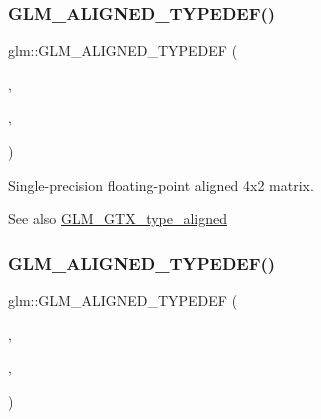 \subsubsection{\texorpdfstring{G\+L\+M\+\_\+\+A\+L\+I\+G\+N\+E\+D\+\_\+\+T\+Y\+P\+E\+D\+E\+F()}{GLM\_ALIGNED\_TYPEDEF()}\hspace{0.1cm}{\footnotesize\ttfamily [178/209]}}
{\footnotesize\ttfamily glm\+::\+G\+L\+M\+\_\+\+A\+L\+I\+G\+N\+E\+D\+\_\+\+T\+Y\+P\+E\+D\+EF (\begin{DoxyParamCaption}\item[{\hyperlink{group__gtc__type__precision_ga9325d382b334066a4c90a814c9040359}{fmat4x2}}]{,  }\item[{aligned\+\_\+fmat4x2}]{,  }\item[{16}]{ }\end{DoxyParamCaption})}

Single-\/precision floating-\/point aligned 4x2 matrix. \begin{DoxySeeAlso}{See also}
\hyperlink{group__gtx__type__aligned}{G\+L\+M\+\_\+\+G\+T\+X\+\_\+type\+\_\+aligned} 
\end{DoxySeeAlso}
\mbox{\label{group__gtx__type__aligned_ga7c117e3ecca089e10247b1d41d88aff9}} 
\subsubsection{\texorpdfstring{G\+L\+M\+\_\+\+A\+L\+I\+G\+N\+E\+D\+\_\+\+T\+Y\+P\+E\+D\+E\+F()}{GLM\_ALIGNED\_TYPEDEF()}\hspace{0.1cm}{\footnotesize\ttfamily [179/209]}}
{\footnotesize\ttfamily glm\+::\+G\+L\+M\+\_\+\+A\+L\+I\+G\+N\+E\+D\+\_\+\+T\+Y\+P\+E\+D\+EF (\begin{DoxyParamCaption}\item[{\hyperlink{group__gtc__type__precision_ga89195b7b13a41b0f1d34a962d1f66bfb}{fmat4x3}}]{,  }\item[{aligned\+\_\+fmat4x3}]{,  }\item[{16}]{ }\end{DoxyParamCaption})}

